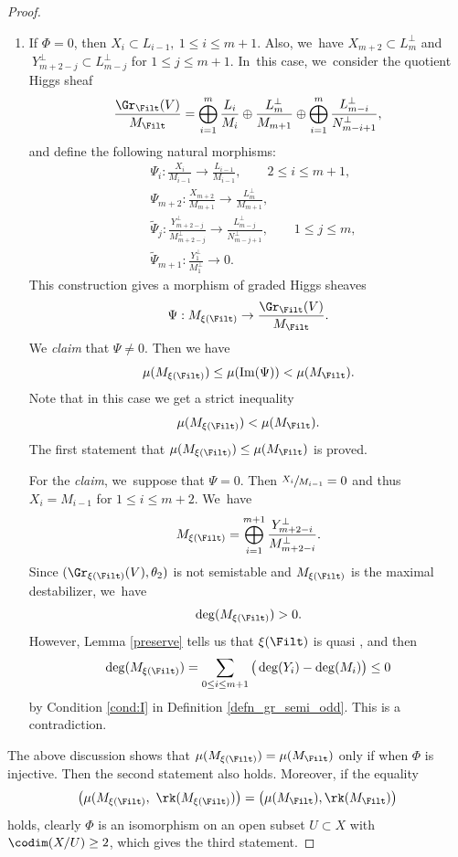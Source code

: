 \begin{proof}
\begin{enumerate}
\item If $\Phi= 0$, then $X_i\subset L_{i-1},\ 1\leq i\leq m+1$. Also, we~have $X_{m+2}\subset L_{m}^\perp$ and $\ Y_{m+2-j}^\perp \subset L_{m-j}^\perp$ for $1\leq j\leq m+1$. In~this case, we~consider the quotient Higgs sheaf
\[
\frac{\Gr_{\Filt}(V)}{M_{\Filt}}=\mathop{\bigoplus}_{i=1}^{m} \frac{L_i}{M_i}\oplus \frac{L_m^\perp}{M_{m+1}}\oplus \mathop{\bigoplus}_{i=1}^{m} \frac{L_{m-i}^\perp}{N_{m-i+1}^\perp},
\]
and define the following natural morphisms:
\begin{equation}
\begin{split}
&\Psi_i:\frac{X_i}{M_{i-1}}\to \frac{L_{i-1}}{M_{i-1}},\qquad 2\leq i\leq m+1,\\
&\Psi_{m+2}:\frac{X_{m+2}}{M_{m+1}}\to \frac{L_m^\perp}{M_{m+1}},\\
&\tilde{\Psi}_j:\frac{Y_{m+2-j}^\perp}{M_{m+2-j}^\perp}\to \frac{L_{m-j}^\perp}{N_{m-j+1}^\perp},\qquad 1\leq j\leq m,\\
&\tilde{\Psi}_{m+1}:\frac{Y_1^\perp}{M_1^\perp}\to 0.
\end{split}
\end{equation}
This construction gives a morphism of graded Higgs sheaves
\[
\Psi: M_{\xi(\Filt)}\to \frac{\Gr_{\Filt}(V)}{M_{\Filt}}.
\]
We \emph{claim} that $\Psi\neq 0$. Then we have
\[
\mu(M_{\xi(\Filt)})\leq \mu(\mathrm{Im}(\Psi)) <\mu(M_{\Filt}).
\]
Note that in this case we get a strict inequality
\[
\mu(M_{\xi(\Filt)})<\mu(M_{\Filt}).
\]
The first statement that $\mu(M_{\xi(\Filt)})\leq \mu(M_{\Filt})$ is proved.

For the \emph{claim}, we~suppose that $\Psi=0$. Then $\sfrac{X_i}{M_{i-1}}=0$ and thus $X_i = M_{i-1}$ for $1 \leq i \leq m+2$. We~have
\[
M_{\xi(\Filt)}=\mathop{\bigoplus}_{i=1}^{m+1} \frac{Y_{m+2-i}^\perp}{M_{m+2-i}^\perp}.
\]
Since $(\Gr_{\xi(\Filt)}(V), \theta_2)$ is not semistable and $M_{\xi(\Filt)}$ is the maximal destabilizer, we~have
\[
\deg(M_{\xi(\Filt)})>0.
\]
However, Lemma \ref{preserve} tells us that $\xi(\Filt)$ is quasi \grsemistable, and then
\begin{equation*}
\deg(M_{\xi(\Filt)})=\sum_{0\leq i\leq m+1}\big(\deg(Y_i)-\deg(M_i)\big)\leq 0
\end{equation*}
by Condition \eqref{cond:I} in Definition \ref{defn_gr_semi_odd}. This is a contradiction.
\end{enumerate}

The above discussion shows that $\mu(M_{\xi(\Filt)})= \mu(M_{\Filt})$ only if when $\Phi$ is injective. Then the second statement also holds. Moreover, if the equality
\[
\big(\mu(M_{\xi(\Filt)},\ \rk(M_{\xi(\Filt)})\big)= \big(\mu(M_{\Filt}),\rk(M_{\Filt})\big)
\]
holds, clearly $\Phi$ is an isomorphism on an open subset $U \subset X$ with $\codim(X/U) \geq 2$, which gives the third statement.
\end{proof}

